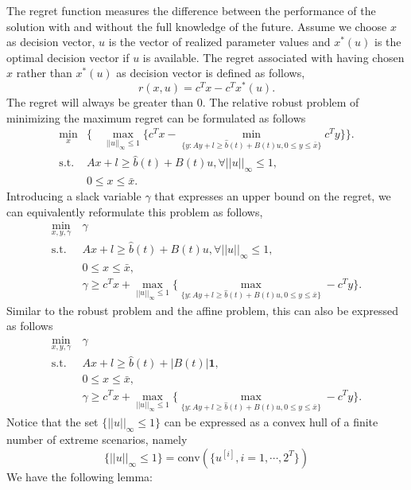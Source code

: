 \documentclass{article}
\begin{document}
    The regret function measures the difference between the performance of the solution with and without the full knowledge of the future. Assume we choose $x$ as decision vector, $u$ is the vector of realized parameter values and $x^*(u)$ is the optimal decision vector if $u$ is available. The regret associated with having chosen $x$ rather than $x^*(u)$ as decision vector is defined as follows,
    \[
        r(x, u) =  c^Tx - c^Tx^*(u).
    \]
    The regret will always be greater than 0. The relative robust problem of minimizing the maximum regret can be formulated as follows
    \[\begin{split}
        \min_{x} & \big\{ \quad\max_{||u||_\infty\leq 1} \big\{c^Tx - 
        \min_{\{y:Ay+l\geq \hat{b}(t)+B(t)u, 0\leq y\leq \bar{x} \}} c^Ty\big\}\big\}. \\
        \text{s.t. } & Ax+l\geq \hat{b}(t) + B(t)u, \forall ||u||_\infty\leq 1, \\
        & 0\leq x\leq \bar{x}.
    \end{split}\]
    Introducing a slack variable $\gamma$ that expresses an upper bound on the regret, we can equivalently reformulate this problem as follows,
    \[\begin{split}
        \min_{x, y, \gamma}\ & \gamma \\
        \text{s.t. } 
        & Ax+l\geq \hat{b}(t) + B(t)u, \forall ||u||_\infty\leq 1,  \\
        & 0\leq x\leq \bar{x}, \\
        & \gamma \geq c^Tx + \max_{||u||_\infty\leq 1} \big\{
        \max_{\{y:Ay+l\geq \hat{b}(t)+B(t)u, 0\leq y\leq \bar{x} \}} - c^Ty\big\}.
    \end{split}\]
    Similar to the robust problem and the affine problem, this can also be expressed as{} follows
    \begin{equation}\label{eq:relative}\begin{split}
        \min_{x, y, \gamma}\ & \gamma \\
        \text{s.t. } 
        & Ax+l\geq \hat{b}(t) + |B(t)|\textbf{1}, \\
        & 0\leq x\leq \bar{x}, \\
        & \gamma \geq c^Tx + \max_{||u||_\infty\leq 1} \big\{
        \max_{\{y:Ay+l\geq \hat{b}(t)+B(t)u, 0\leq y\leq \bar{x} \}} - c^Ty\big\}.
    \end{split}\end{equation}
    Notice that the set $\{||u||_\infty \leq 1\}$ can be expressed as a convex hull of a finite number of extreme scenarios, namely
    \[\{||u||_\infty \leq 1\} = \text{conv}(\{u^{[i]}, i = 1, \cdots, 2^T\})\]
    We have the following lemma:
\end{document}
